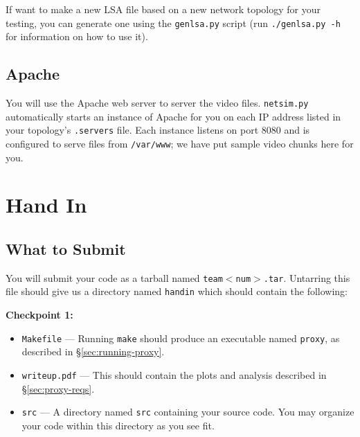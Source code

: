 \documentclass{article}
\begin{document}
If want to make a new LSA file based on a new network topology for your
testing, you can generate one using the \texttt{genlsa.py} script (run
\texttt{./genlsa.py -h} for information on how to use it).





%



\subsection{Apache}
\label{sec:apache}

You will use the Apache web server to server the video files.
\texttt{netsim.py} automatically starts an instance of Apache for you on each
IP address listed in your topology's \texttt{.servers} file. Each instance
listens on port 8080 and is configured to serve files from \texttt{/var/www};
we have put sample video chunks here for you.




\section{Hand In}

\subsection{What to Submit}

You will submit your code as a tarball named \texttt{team$<$num$>$.tar}.
Untarring this file should give us a directory named \texttt{handin} which
should contain the following:

\medskip \noindent \textbf{Checkpoint 1:}
\begin{itemize}
	\item \texttt{Makefile} --- Running \texttt{make} should produce an
	executable named \texttt{proxy}, as described in \S\ref{sec:running-proxy}.

	\item \texttt{writeup.pdf} --- This should contain the plots and analysis
	described in \S\ref{sec:proxy-reqs}. 

	\item \texttt{src} --- A directory named \texttt{src} containing your
	source code. You may organize your code within this directory as you see
	fit.
\end{itemize}
\end{document}
